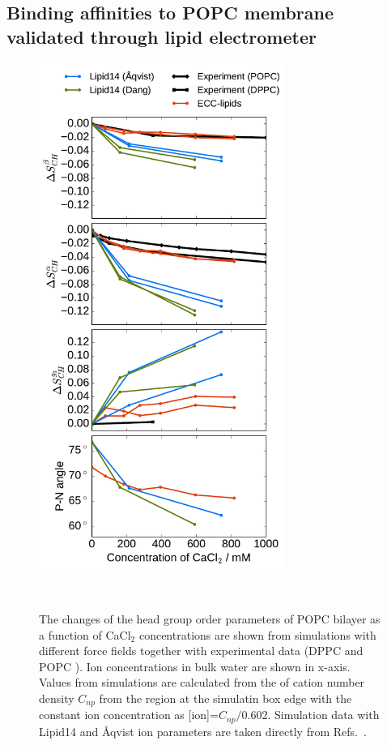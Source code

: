 \documentclass[aip,jcp,twocolumn]{revtex4}
\begin{document}
\subsection{Binding affinities to POPC membrane validated through lipid electrometer}

\begin{figure}[tbp]
  \centering
  \includegraphics[width=8.0cm]{../Fig/ipython_nb/PN_angle_OrdPars-A-B-g3_L14-ECCL17_q80_sig89_CaCl.pdf}
  \caption{\label{fig:delta_ordPar_CaCl}
    The changes of the head group order parameters of POPC bilayer as a function of CaCl$_2$ concentrations
    are shown from simulations with different force fields together with experimental data 
    (DPPC \cite{akutsu81} and POPC \cite{altenbach84}). 
    Ion concentrations in bulk water are shown in x-axis. 
    Values from simulations are calculated from the of cation number density $C_{np}$
    from the region at the simulatin box edge with the constant ion concentration as [ion]=$C_{np}/0.602$.
    Simulation data with Lipid14 and \AA{}qvist ion parameters are taken directly from
    Refs.~\cite{lipid14POPC0mMNaClfiles,lipid14POPC350mMCaClfiles,lipid14POPC350mMCaClfilesNC}.
  }
   \\
\end{figure}
\end{document}
